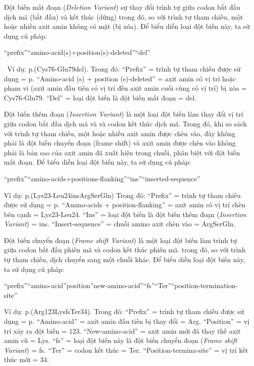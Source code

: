 \documentclass[../DoAn.tex]{subfiles}
\begin{document}
Đột biến mất đoạn (\textit{Deletion Variant}) sự thay đổi trình tự giữa codon bắt đầu dịch mã (bắt đầu) và kết thúc (dừng) trong đó, so với trình tự tham chiếu, một hoặc nhiều axit amin không có mặt (bị xóa). Để biểu diễn loại đột biến này, ta sử dụng cú pháp: 
\begin{center}“prefix”“amino-acid(s)+position(s)-deleted”“del”\end{center}\
Ví dụ: p.(Cys76-Glu79del). Trong đó: “Prefix” = trình tự tham chiếu được sử dụng = p. “Amino-acid (s) + position (s)-deleted” = axit amin có vị trí hoặc phạm vi (axit amin đầu tiên có vị trí đến axit amin cuối cùng có vị trí) bị xóa = Cys76-Glu79. “Del” = loại đột biến là đột biến mất đoạn = del.

Đột biến thêm đoạn (\textit{Insertion Variant}) là một loại đột biến làm thay đổi vị trí giữa codon bắt đầu dịch mã và và codon kết thúc dịch mã. Trong đó, khi so sách với trình tự tham chiếu, một hoặc nhiều axit amin được chèn vào, đây không phải là đột biến chuyển đoạn (frame shift) và axit amin được chèn vào không phải là bản sao của axit amin đã xuất hiện trong chuỗi, phân biệt với đột biến mất đoạn. Để biểu diễn loại đột biến này, ta sử dụng cú pháp:
\begin{center}“prefix”“amino-acids+positions-flanking”“ins”“inserted-sequence”\end{center}
Ví dụ:  p.(Lys23-Leu24insArgSerGln) Trong đó: “Prefix” = trình tự tham chiếu được sử dụng = p. “Amino-acids + position-flanking” = axit amin có vị trí chèn bên cạnh = Lys23-Leu24. “Ins” = loại đột biến là đột biến thêm đoạn (\textit{Insertion Variant}) = ins. “Insert-sequence” = chuỗi amino axit chèn vào = ArgSerGln.

Đột biến chuyển đoạn (\textit{Frame shift Variant}) là một loại đột biến làm trình tự giữa codon bắt đầu phiên mã và codon kết thúc phiên mã. trong đó, so với trình tự tham chiếu, dịch chuyển sang một chuỗi khác. Để biểu diễn loại đột biến này, ta sử dụng cú pháp:
\begin{center}  “prefix”“amino-acid”position”new-amino-acid”“fs”“Ter”“position-termination-site”\end{center}
Ví dụ: p.(Arg123LysfsTer34). Trong đó: “Prefix” = trình tự tham chiếu được sử dụng = p. “Amino-acid” = axit amin đầu tiên bị thay đổi = Arg. “Position” = vị trí xảy ra đột biến = 123. “New-amino-acid” = axit amin mới đã thay thế axit amin cũ = Lys. “fs” = loại đột biến này là đột biến chuyển đoạn (\textit{Frame shift Variant}) = fs. “Ter” = codon kết thúc = Ter. “Position-termina-site” = vị trí kết thúc mới = 34.
\end{document}
